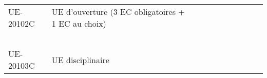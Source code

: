 \documentclass[a4paper,11pt]{article}
\begin{document}
{{\begin{tabular}{lllllllllll}
\rowcolor[HTML]{C0C0C0} 
UE-20102C                      & UE d'ouverture (3 EC obligatoires + 1 EC au choix) &                           &                           &                           &                                    &                             &                             &                                    &                                  &                                  \\
                               &                                                    &                           &                           &                           &                                    &                             &                             &                                    &                                  &                                  \\
                               &                                                    &                           &                           &                           &                                    &                             &                             &                                    &                                  &                                  \\
                               &                                                    &                           &                           &                           &                                    &                             &                             &                                    &                                  &                                  \\
                               &                                                    &                           &                           &                           &                                    &                             &                             &                                    &                                  &                                  \\
                               &                                                    &                           &                           &                           &                                    &                             &                             &                                    &                                  &                                  \\
\rowcolor[HTML]{C0C0C0} 
UE-20103C                      & UE disciplinaire                                   &                           &                           &                           &                                    &                             &                             &                                    &                                  &                                  \\

\end{tabular}}}
\end{document}
